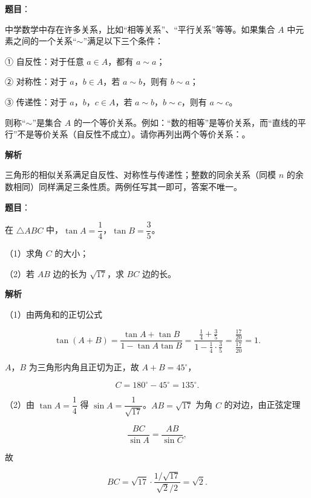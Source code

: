 \begin{answer}

\textbf{题目}：

中学数学中存在许多关系，比如“相等关系”、“平行关系”等等。如果集合 $A$ 中元素之间的一个关系“$\sim$”满足以下三个条件：

① 自反性：对于任意 $a\in A$，都有 $a\sim a$；

② 对称性：对于 $a$，$b\in A$，若 $a\sim b$，则有 $b\sim a$；

③ 传递性：对于 $a$，$b$，$c\in A$，若 $a\sim b$，$b\sim c$，则有 $a\sim c$。

则称“$\sim$”是集合 $A$ 的一个等价关系。例如：“数的相等”是等价关系，而“直线的平行”不是等价关系（自反性不成立）。请你再列出两个等价关系：\gkblank{}。

\textbf{解析}

三角形的相似关系满足自反性、对称性与传递性；整数的同余关系（同模 $n$ 的余数相同）同样满足三条性质。两例任写其一即可，答案不唯一。


\end{answer}
\begin{answer}

\textbf{题目}：

在 $\triangle ABC$ 中，$\tan A=\dfrac14$，$\tan B=\dfrac35$。

（1）求角 $C$ 的大小；

（2）若 $AB$ 边的长为 $\sqrt{17}$，求 $BC$ 边的长。

\textbf{解析}

（1）由两角和的正切公式

\nopagebreak[4]
\[\tan(A+B)=\frac{\tan A+\tan B}{1-\tan A\tan B}
=\frac{\frac14+\frac35}{1-\frac14\cdot\frac35}
=\frac{\frac{17}{20}}{\frac{17}{20}}=1.\]

$A$，$B$ 为三角形内角且正切为正，故 $A+B=45^\circ$，

\nopagebreak[4]
\[C=180^\circ-45^\circ=135^\circ.\]

（2）由 $\tan A=\dfrac14$ 得 $\sin A=\dfrac1{\sqrt{17}}$。$AB=\sqrt{17}$ 为角 $C$ 的对边，由正弦定理

\nopagebreak[4]
\[\frac{BC}{\sin A}=\frac{AB}{\sin C},\]

故

\nopagebreak[4]
\[BC=\sqrt{17}\cdot\frac{1/\sqrt{17}}{\sqrt2/2}=\sqrt2.\]


\end{answer}
